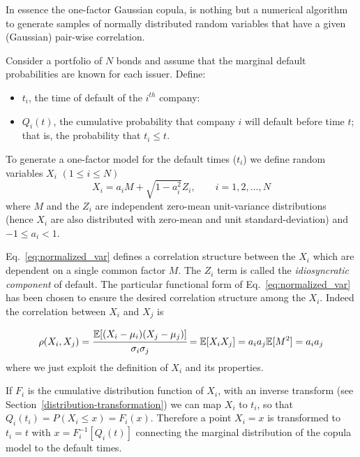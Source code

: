 In essence the one-factor Gaussian copula, is nothing but a numerical algorithm to generate samples of normally distributed random variables that have a given (Gaussian) pair-wise correlation. 

Consider a portfolio of $N$ bonds and assume that the marginal default probabilities are known for each issuer. Define:

\begin{itemize}
\tightlist
\item
$t_i$, the time of default of the $i^{th}$ company:
\item $Q_i(t)$, the cumulative probability that company $i$ will default before time $t$; that is, the probability that $t_i \le t$.
\end{itemize}

To generate a one-factor model for the default times ($t_i$) we define random variables $X_i$ $(1\le i \le N)$
\begin{equation}
X_i = a_i M + \sqrt{1-a_i^2}Z_i,\qquad i = 1, 2,\ldots, N
\label{eq:normalized_var}
\end{equation}
where $M$ and the $Z_i$ are independent zero-mean unit-variance  distributions (hence $X_i$ are also distributed with zero-mean and unit standard-deviation) and $-1 \le a_i < 1$.

Eq.~\ref{eq:normalized_var} defines a correlation structure between the $X_i$ which are dependent on a single common factor $M$. The $Z_i$ term is called the \emph{idiosyncratic component} of default. The particular functional form of Eq.~\ref{eq:normalized_var} has been chosen to ensure the desired correlation structure among the $X_i$. Indeed the correlation between $X_i$ and $X_j$ is

\begin{equation*}
\rho(X_i, X_j) = \cfrac{\mathbb{E}[(X_i-\mu_i)(X_j-\mu_j)]}{\sigma_{i}\sigma_{j}} = \mathbb{E}[X_i X_j] = a_i a_j \mathbb{E}[M^2] = a_i a_j
\end{equation*}
where we just exploit the definition of $X_i$ and its properties.

If $F_i$ is the cumulative distribution function of $X_i$, with an inverse transform (see Section~\ref{distribution-transformation}) we can map $X_i$ to $t_i$, so that $Q_i(t_i) = P(X_i\le x)=F_i(x)$. Therefore a point $X_i = x$ is transformed to $t_i = t$ with $x = F_i^{-1}[Q_i(t)]$ connecting the marginal distribution of the copula model to the default times.

